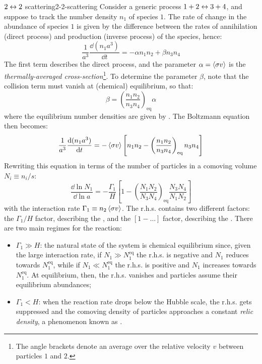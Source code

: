 \begin{example}{$ 2 \leftrightarrow 2 $ scattering}{2-2-scattering}
  Consider a generic process $ 1 + 2 \leftrightarrow 3 + 4 $, and suppose to track the number density $ n_1 $ of species $ 1 $. The rate of change in the abundance of species $ 1 $ is given by the difference between the rates of annihilation (direct process) and production (inverse process) of the species, hence:
  \begin{equation*}
    \frac{1}{a^3} \frac{\dd (n_1 a^3)}{\dd t} = - \alpha n_1 n_2 + \beta n_3 n_4
  \end{equation*}
  The first term describes the direct process, and the parameter $ \alpha = \braket{\sigma v} $ is the \emph{thermally-averaged cross-section}\footnote{The angle brackets denote an average over the relative velocity $ v $ between particles $ 1 $ and $ 2 $.}. To determine the parameter $ \beta $, note that the collision term must vanish at (chemical) equilibrium, so that:
  \begin{equation*}
    \beta = \left( \frac{n_1 n_2}{n_3 n_4} \right)_\text{eq} \alpha
  \end{equation*}
  where the equilibrium number densities are given by . The Boltzmann equation then becomes:
  \begin{equation}
    \frac{1}{a^3} \frac{\mathrm{d} (n_1 a^3)}{\mathrm{d} t} = - \braket{\sigma v} \left[ n_1 n_2 - \left( \frac{n_1 n_2}{n_3 n_4} \right)_\text{eq} n_3 n_4 \right]
    \label{eq:boltzmann-2-2}
  \end{equation}
  Rewriting this equation in terms of the number of particles in a comoving volume $ N_i \equiv n_i / s $:
  \begin{equation}
    \frac{\dd \ln N_1}{\dd \ln a} = - \frac{\Gamma_1}{H} \left[ 1 - \left( \frac{N_1 N_2}{N_3 N_4} \right)_\text{eq} \frac{N_3 N_4}{N_1 N_2} \right]
  \end{equation}
  with the interaction rate $ \Gamma_1 \equiv n_2 \braket{\sigma v} $. The r.h.s. contains two different factors: the $ \Gamma_1 / H $ factor, describing the , and the $ [1 - \dots] $ factor, describing the . There are two main regimes for the reaction:
  \begin{itemize}
    \item $ \Gamma_1 \gg H $: the natural state of the system is chemical equilibrium since, given the large interaction rate, if $ N_1 \gg N_1^\text{eq} $ the r.h.s. is negative and $ N_1 $ reduces towards $ N_1^\text{eq} $, while if $ N_1 \ll N_1^\text{eq} $ the r.h.s. is positive and $ N_1 $ increases towards $ N_1^\text{eq} $. At equilibrium, then, the r.h.s. vanishes and particles assume their equilibrium abundances;
    \item $ \Gamma_1 < H $: when the reaction rate drops below the Hubble scale, the r.h.s. gets suppressed and the comoving density of particles approaches a constant \emph{relic density}, a phenomenon known as .
  \end{itemize}
\end{example}

